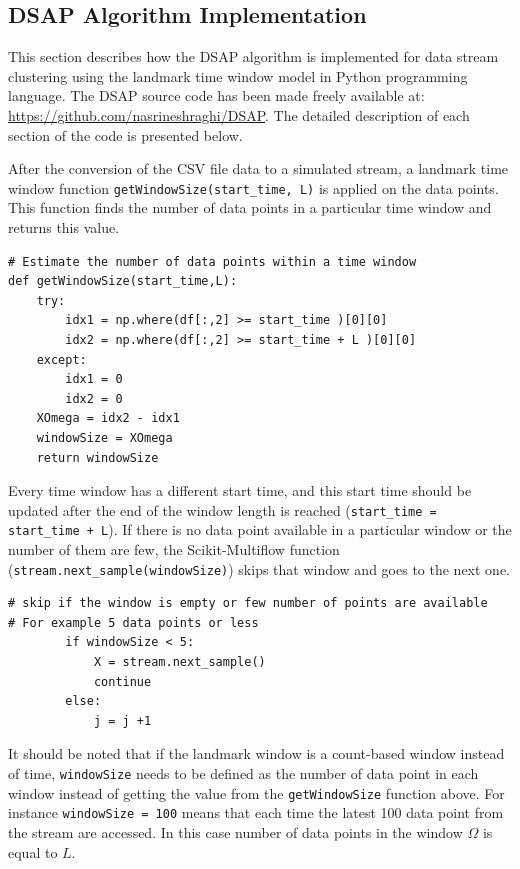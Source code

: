 \subsection{DSAP Algorithm Implementation}
This section describes how the DSAP algorithm is implemented for data stream clustering using the landmark time window model in Python programming language. The DSAP source code has been made freely available at: \url{https://github.com/nasrineshraghi/DSAP}. The detailed description of each section of the code is presented below.

After the conversion of the CSV file data to a simulated stream, a landmark time window function \texttt{getWindowSize(start\_time, L)} is applied on the data points. This function finds the number of data points in a particular time window and returns this value. 

\begin{lstlisting}
# Estimate the number of data points within a time window
def getWindowSize(start_time,L):
    try:
        idx1 = np.where(df[:,2] >= start_time )[0][0]
        idx2 = np.where(df[:,2] >= start_time + L )[0][0] 
    except:
        idx1 = 0
        idx2 = 0
    XOmega = idx2 - idx1
    windowSize = XOmega
    return windowSize
\end{lstlisting}


Every time window has a different start time, and this start time should be updated after the end of the window length is reached (\texttt{start\_time = start\_time + L}). If there is no data point available in a particular window or the number of them are few, the Scikit-Multiflow function (\texttt{stream.next\_sample(windowSize)}) skips that window and goes to the next one.

\begin{lstlisting}
# skip if the window is empty or few number of points are available
# For example 5 data points or less 
        if windowSize < 5:
            X = stream.next_sample()
            continue
        else:    
            j = j +1
\end{lstlisting}


It should be noted that if the landmark window is a count-based window instead of time, \texttt{windowSize} needs to be defined as the number of data point in each window instead of getting the value from the \texttt{getWindowSize} function above. For instance \texttt{windowSize = 100} means that each time the latest 100 data point from the stream are accessed. In this case number of data points in the window $\Omega$ is equal to $L$.

